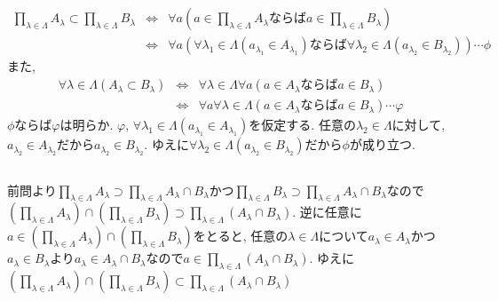 \documentclass{jsarticle}
\begin{document}
\subsection{} %
\begin{eqnarray*}
	\prod_{\lambda \in \Lambda}A_\lambda \subset \prod_{\lambda \in \Lambda}B_\lambda
	&\Leftrightarrow& \forall{a}(a \in \prod_{\lambda \in \Lambda}A_\lambda ならば a \in \prod_{\lambda \in \Lambda}B_\lambda)\\
	&\Leftrightarrow& \forall{a}(\forall{\lambda_1 \in \Lambda}(a_{\lambda_1} \in A_{\lambda_1}) ならば \forall{\lambda_2 \in \Lambda}(a_{\lambda_2} \in B_{\lambda_2})) \cdots \phi
\end{eqnarray*}
また,
\begin{eqnarray*}
	\forall{\lambda \in \Lambda}(A_\lambda \subset B_\lambda)
	&\Leftrightarrow& \forall{\lambda \in \Lambda}\forall{a}(a \in A_\lambda ならば a \in B_\lambda)\\
	&\Leftrightarrow& \forall{a}\forall{\lambda \in \Lambda}(a \in A_\lambda ならば a \in B_\lambda) \cdots \varphi
\end{eqnarray*}
$\phi ならば \varphi$は明らか. $\varphi$, $\forall{\lambda_1 \in \Lambda}(a_{\lambda_1} \in A_{\lambda_1})$を仮定する. 任意の$\lambda_2 \in \Lambda$に対して, $a_{\lambda_2} \in A_{\lambda_2}$だから$a_{\lambda_2} \in B_{\lambda_2}$. ゆえに$\forall{\lambda_2 \in \Lambda}(a_{\lambda_2} \in B_{\lambda_2})$だから$\phi$が成り立つ.

\subsection{} %
前問より$\prod_{\lambda \in \Lambda}A_\lambda \supset \prod_{\lambda \in \Lambda}A_\lambda \cap B_\lambda$かつ$\prod_{\lambda \in \Lambda}B_\lambda \supset \prod_{\lambda \in \Lambda}A_\lambda \cap B_\lambda$なので$\left(\prod_{\lambda \in \Lambda}A_\lambda\right) \cap \left(\prod_{\lambda \in \Lambda}B_\lambda\right) \supset \prod_{\lambda \in \Lambda}\left(A_\lambda \cap B_\lambda\right)$. 逆に任意に$a \in \left(\prod_{\lambda \in \Lambda}A_\lambda\right) \cap \left(\prod_{\lambda \in \Lambda}B_\lambda\right)$をとると, 任意の$\lambda \in \Lambda$について$a_\lambda \in A_\lambda$かつ$a_\lambda \in B_\lambda$より$a_\lambda \in A_\lambda \cap B_\lambda$なので$a \in \prod_{\lambda \in \Lambda}\left(A_\lambda \cap B_\lambda\right)$. ゆえに$\left(\prod_{\lambda \in \Lambda}A_\lambda\right) \cap \left(\prod_{\lambda \in \Lambda}B_\lambda\right) \subset \prod_{\lambda \in \Lambda}\left(A_\lambda \cap B_\lambda\right)$
\end{document}
